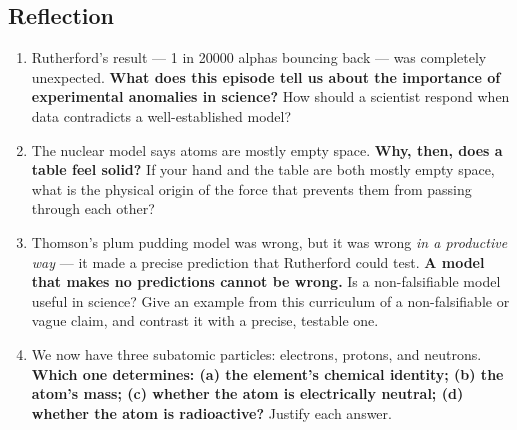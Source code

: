 \documentclass[12pt, a4paper]{book}
\theoremstyle{definition}
\begin{document}
\subsection*{Reflection}

\begin{reflectionbox}
\begin{enumerate}[label=\textbf{R\arabic*.}]
  \item Rutherford's result --- 1 in 20000 alphas bouncing back ---
        was completely unexpected.
        \textbf{What does this episode tell us about the
        importance of experimental anomalies in science?}
        How should a scientist respond when data contradicts
        a well-established model?

  \item The nuclear model says atoms are mostly empty space.
        \textbf{Why, then, does a table feel solid?}
        If your hand and the table are both mostly empty space,
        what is the physical origin of the force that prevents
        them from passing through each other?

  \item Thomson's plum pudding model was wrong,
        but it was wrong \emph{in a productive way} ---
        it made a precise prediction that Rutherford could test.
        \textbf{A model that makes no predictions cannot be wrong.}
        Is a non-falsifiable model useful in science?
        Give an example from this curriculum of a non-falsifiable
        or vague claim, and contrast it with a precise,
        testable one.

  \item We now have three subatomic particles:
        electrons, protons, and neutrons.
        \textbf{Which one determines:
        (a) the element's chemical identity;
        (b) the atom's mass;
        (c) whether the atom is electrically neutral;
        (d) whether the atom is radioactive?}
        Justify each answer.
\end{enumerate}
\end{reflectionbox}
\end{document}
